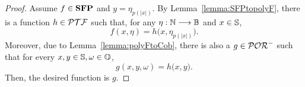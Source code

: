 \begin{proof}
Assume $f\in \mathbf{SFP}$ and $y = \eta_{p(|x|)}$.
By Lemma~\ref{lemma:SFPtopolyF},
there is a function $h\in \mathcal{PTF}$ such that,
for any $\eta :\mathbb{N} \longrightarrow \mathbb{B}$ and
$x\in \mathbb{S}$,
$$
f(x,\eta) = h\big(x,\eta_{p(|x|)}\big).
$$
%
%
Moreover,
due to Lemma~\ref{lemma:polyFtoCob},
there is also a $g\in \mathcal{POR}^-$ such that for every $x, y \in \mathbb{S}, \omega \in \mathbb{O}$,
%
$$
g(x,y, \omega) = h\big( x, y \big).
$$
%
%
Then, the desired function is $g$.
\end{proof}




























































































